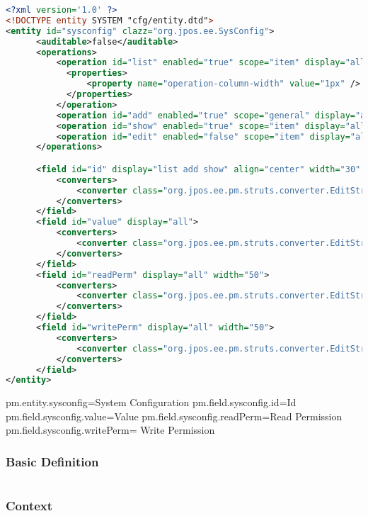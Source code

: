 \begin{lstlisting}[language=XML]
<?xml version='1.0' ?>
<!DOCTYPE entity SYSTEM "cfg/entity.dtd">  
<entity id="sysconfig" clazz="org.jpos.ee.SysConfig">
      <auditable>false</auditable>
      <operations>
          <operation id="list" enabled="true" scope="item" display="all">
            <properties>
                <property name="operation-column-width" value="1px" />
            </properties>
          </operation>
          <operation id="add" enabled="true" scope="general" display="all"/>
          <operation id="show" enabled="true" scope="item" display="all"/>
          <operation id="edit" enabled="false" scope="item" display="all"/>
      </operations>

      <field id="id" display="list add show" align="center" width="30" >
          <converters>
              <converter class="org.jpos.ee.pm.struts.converter.EditStringConverter" operations="add edit" />
          </converters>
      </field>
      <field id="value" display="all">
          <converters>
              <converter class="org.jpos.ee.pm.struts.converter.EditStringConverter" operations="add edit" />
          </converters>
      </field>
      <field id="readPerm" display="all" width="50">
          <converters>
              <converter class="org.jpos.ee.pm.struts.converter.EditStringConverter" operations="add edit" />
          </converters>
      </field>
      <field id="writePerm" display="all" width="50">
          <converters>
              <converter class="org.jpos.ee.pm.struts.converter.EditStringConverter" operations="add edit" />
          </converters>
      </field>
</entity>
\end{lstlisting}


pm.entity.sysconfig=System Configuration
pm.field.sysconfig.id=Id
pm.field.sysconfig.value=Value 
pm.field.sysconfig.readPerm=Read Permission
pm.field.sysconfig.writePerm= Write Permission



\subsubsection{Basic Definition}

\begin{lstlisting}[language=XML]

\end{lstlisting}

\subsubsection{Context}
\begin{lstlisting}[language=XML]

\end{lstlisting}
